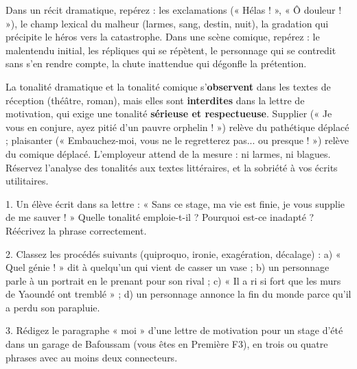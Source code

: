 \documentclass[11pt]{article}
\begin{document}
\begin{exemplebox}
Dans un récit dramatique, repérez : les exclamations (« Hélas ! », « Ô douleur ! »), le champ lexical du malheur (larmes, sang, destin, nuit), la gradation qui précipite le héros vers la catastrophe. Dans une scène comique, repérez : le malentendu initial, les répliques qui se répètent, le personnage qui se contredit sans s'en rendre compte, la chute inattendue qui dégonfle la prétention.
\end{exemplebox}

\begin{attention}
La tonalité dramatique et la tonalité comique s'\textbf{observent} dans les textes de réception (théâtre, roman), mais elles sont \textbf{interdites} dans la lettre de motivation, qui exige une tonalité \textbf{sérieuse et respectueuse}. Supplier (« Je vous en conjure, ayez pitié d'un pauvre orphelin ! ») relève du pathétique déplacé ; plaisanter (« Embauchez-moi, vous ne le regretterez pas... ou presque ! ») relève du comique déplacé. L'employeur attend de la mesure : ni larmes, ni blagues. Réservez l'analyse des tonalités aux textes littéraires, et la sobriété à vos écrits utilitaires.
\end{attention}

\begin{exercice}
1. Un élève écrit dans sa lettre : « Sans ce stage, ma vie est finie, je vous supplie de me sauver ! » Quelle tonalité emploie-t-il ? Pourquoi est-ce inadapté ? Réécrivez la phrase correctement.

2. Classez les procédés suivants (quiproquo, ironie, exagération, décalage) : a) « Quel génie ! » dit à quelqu'un qui vient de casser un vase ; b) un personnage parle à un portrait en le prenant pour son rival ; c) « Il a ri si fort que les murs de Yaoundé ont tremblé » ; d) un personnage annonce la fin du monde parce qu'il a perdu son parapluie.

3. Rédigez le paragraphe « moi » d'une lettre de motivation pour un stage d'été dans un garage de Bafoussam (vous êtes en Première F3), en trois ou quatre phrases avec au moins deux connecteurs.
\end{exercice}
\end{document}
